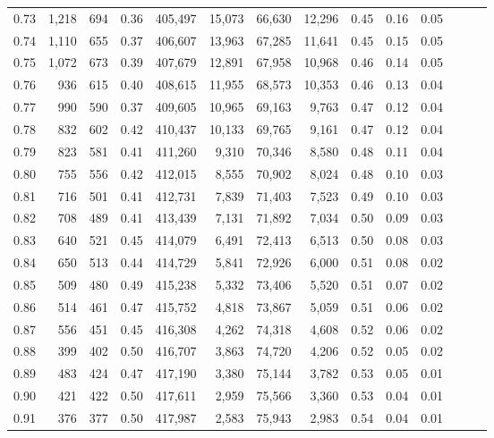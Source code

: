 \begin{tabular}{rrrrrrrrrrrrrr}
0.73 &  1,218 &    694 &  0.36 &  405,497 &   15,073 &  66,630 &  12,296 &  0.45 &  0.16 &      0.05 \\
0.74 &  1,110 &    655 &  0.37 &  406,607 &   13,963 &  67,285 &  11,641 &  0.45 &  0.15 &      0.05 \\
0.75 &  1,072 &    673 &  0.39 &  407,679 &   12,891 &  67,958 &  10,968 &  0.46 &  0.14 &      0.05 \\
0.76 &    936 &    615 &  0.40 &  408,615 &   11,955 &  68,573 &  10,353 &  0.46 &  0.13 &      0.04 \\
0.77 &    990 &    590 &  0.37 &  409,605 &   10,965 &  69,163 &   9,763 &  0.47 &  0.12 &      0.04 \\
0.78 &    832 &    602 &  0.42 &  410,437 &   10,133 &  69,765 &   9,161 &  0.47 &  0.12 &      0.04 \\
0.79 &    823 &    581 &  0.41 &  411,260 &    9,310 &  70,346 &   8,580 &  0.48 &  0.11 &      0.04 \\
0.80 &    755 &    556 &  0.42 &  412,015 &    8,555 &  70,902 &   8,024 &  0.48 &  0.10 &      0.03 \\
0.81 &    716 &    501 &  0.41 &  412,731 &    7,839 &  71,403 &   7,523 &  0.49 &  0.10 &      0.03 \\
0.82 &    708 &    489 &  0.41 &  413,439 &    7,131 &  71,892 &   7,034 &  0.50 &  0.09 &      0.03 \\
0.83 &    640 &    521 &  0.45 &  414,079 &    6,491 &  72,413 &   6,513 &  0.50 &  0.08 &      0.03 \\
0.84 &    650 &    513 &  0.44 &  414,729 &    5,841 &  72,926 &   6,000 &  0.51 &  0.08 &      0.02 \\
0.85 &    509 &    480 &  0.49 &  415,238 &    5,332 &  73,406 &   5,520 &  0.51 &  0.07 &      0.02 \\
0.86 &    514 &    461 &  0.47 &  415,752 &    4,818 &  73,867 &   5,059 &  0.51 &  0.06 &      0.02 \\
0.87 &    556 &    451 &  0.45 &  416,308 &    4,262 &  74,318 &   4,608 &  0.52 &  0.06 &      0.02 \\
0.88 &    399 &    402 &  0.50 &  416,707 &    3,863 &  74,720 &   4,206 &  0.52 &  0.05 &      0.02 \\
0.89 &    483 &    424 &  0.47 &  417,190 &    3,380 &  75,144 &   3,782 &  0.53 &  0.05 &      0.01 \\
0.90 &    421 &    422 &  0.50 &  417,611 &    2,959 &  75,566 &   3,360 &  0.53 &  0.04 &      0.01 \\
0.91 &    376 &    377 &  0.50 &  417,987 &    2,583 &  75,943 &   2,983 &  0.54 &  0.04 &      0.01 \\

\end{tabular}
